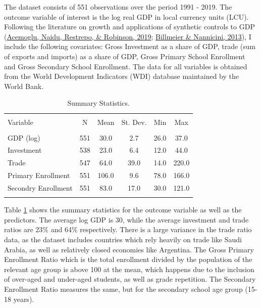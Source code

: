 \documentclass[12pt,nobind, a4paper]{reedthesis}
\begin{document}
 The dataset consists of 551 observations over the period 1991 - 2019. The outcome variable of interest is the log real GDP in local currency units (LCU). Following the literature on growth and applications of synthetic controls to GDP (\protect\hyperlink{ref-acemoglu_democracy_2019}{Acemoglu, Naidu, Restrepo, \& Robinson, 2019}; \protect\hyperlink{ref-billmeier_assessing_2013}{Billmeier \& Nannicini, 2013}), I include the following covariates: Gross Investment as a share of GDP, trade (sum of exports and imports) as a share of GDP, Gross Primary School Enrollment and Gross Secondary School Enrollment. The data for all variables is obtained from the World Development Indicators (WDI) database maintained by the World Bank.
 \begin{table}[h!!!] 
 \centering 
 \begin{tabular}{@{\extracolsep{5pt}}lccccc} 
 \\[-1.8ex]
 \hline \\[-1.8ex] 
 \B Variable & \multicolumn{1}{c}{\B N} & \multicolumn{1}{c}{\B Mean} & \multicolumn{1}{c}{\B St. Dev.} & \multicolumn{1}{c}{\B Min} & \multicolumn{1}{c}{\B Max} \\ 
 \hline \\[-1.8ex] 
 GDP (log) & 551 & 30.0 & 2.7 & 26.0 & 37.0 \\ 
 Investment & 538 & 23.0 & 6.4 & 12.0 & 44.0 \\ 
 Trade & 547 & 64.0 & 39.0 & 14.0 & 220.0 \\ 
 Primary Enrollment & 551 & 106.0 & 9.6 & 78.0 & 166.0 \\ 
 Secondry Enrollment & 551 & 83.0 & 17.0 & 30.0 & 121.0 \\ 
 \hline \\[-1.8ex] 
 \end{tabular} 
   \caption{ Summary Statistics.} 
   \label{tab:t31}
 \end{table}
 \linebreak

 Table \ref{tab:t31} shows the summary statistics for the outcome variable as well as the predictors. The average log GDP is 30, while the average investment and trade ratios are 23\% and 64\% respectively. There is a large variance in the trade ratio data, as the dataset includes countries which rely heavily on trade like Saudi Arabia, as well as relatively closed economies like Argentina. The Gross Primary Enrollment Ratio which is the total enrollment divided by the population of the relevant age group is above 100 at the mean, which happens due to the inclusion of over-aged and under-aged students, as well as grade repetition. The Secondary Enrollment Ratio measures the same, but for the secondary school age group (15-18 years).
 \linebreak
\end{document}
